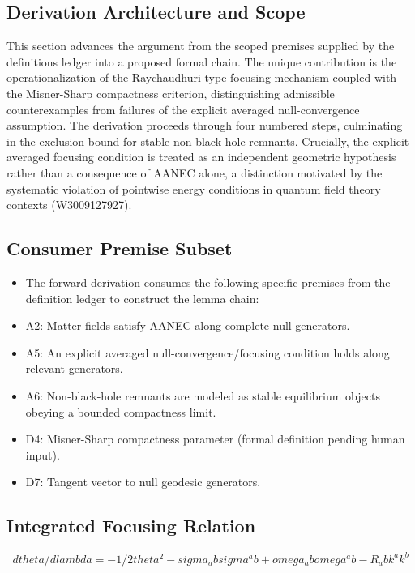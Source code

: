 \documentclass[conference]{IEEEtran}
\begin{document}
\subsection{Derivation Architecture and Scope}
This section advances the argument from the scoped premises supplied by the definitions ledger into a proposed formal chain. The unique contribution is the operationalization of the Raychaudhuri-type focusing mechanism coupled with the Misner-Sharp compactness criterion, distinguishing admissible counterexamples from failures of the explicit averaged null-convergence assumption. The derivation proceeds through four numbered steps, culminating in the exclusion bound for stable non-black-hole remnants. Crucially, the explicit averaged focusing condition is treated as an independent geometric hypothesis rather than a consequence of AANEC alone, a distinction motivated by the systematic violation of pointwise energy conditions in quantum field theory contexts (W3009127927).~\cite{cite_0ed84243cf171bc4}

\subsection{Consumer Premise Subset}
\begin{itemize}
\item The forward derivation consumes the following specific premises from the definition ledger to construct the lemma chain:
\item A2: Matter fields satisfy AANEC along complete null generators.
\item A5: An explicit averaged null-convergence/focusing condition holds along relevant generators.
\item A6: Non-black-hole remnants are modeled as stable equilibrium objects obeying a bounded compactness limit.
\item D4: Misner-Sharp compactness parameter (formal definition pending human input).
\item D7: Tangent vector to null geodesic generators.
\end{itemize}

\subsection{Integrated Focusing Relation}
\begin{equation}
dtheta/dlambda = -1/2 theta^2 - sigma_ab sigma^ab + omega_ab omega^ab - R_ab k^a k^b
\label{eq:forward-derivation-and-counterexamples-fd-equation-block}
\end{equation}
\end{document}

